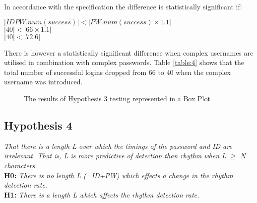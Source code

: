 \documentclass{article}
\begin{document}
In accordance with the specification the difference is statistically significant if: 
\begin{center}
    $ |IDPW.num(success)| < |PW.num(success) \times 1.1|$ \\
    $ |40| < |66 \times 1.1| $ \\
    $ |40| < |72.6| $
\end{center} 

There is however a statistically significant difference when complex usernames are utilised in combination with complex passwords. Table \ref{table:4} shows that the total number of successful logins dropped from 66 to 40 when the complex username was introduced. \\ 

\begin{figure} [H]
    \centering
    \caption{The results of Hypothesis 3 testing represented in a Box Plot}
    \label{fig:boxPlotHyp3}
\end{figure}

\subsection{Hypothesis 4}
\begin{center}
\textit{That there is a length L over which the timings of the password and ID are
irrelevant. That is, L is more predictive of detection than rhythm when L $\geq$ N characters.} \newline \\

\textbf{H0:} \textit{There	is	no	length	L	(=ID+PW) which	effects	a	change	in	the	rhythm detection	rate.} \newline \\

\textbf{H1:} \textit{There	is	a	length	L	which	affects	the	rhythm	detection	rate.}
\end{center}
\end{document}

